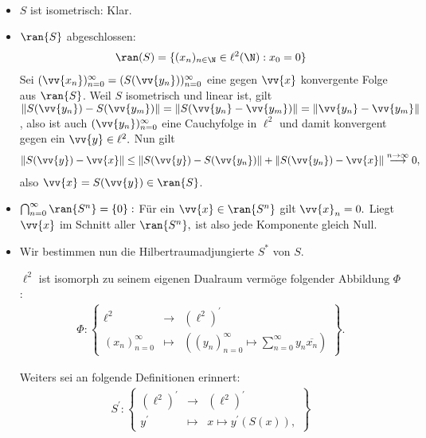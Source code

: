 \begin{solution}
  \leavevmode \\
  \begin{itemize}
      \item $S$ ist isometrisch: Klar.
      \item $\ran{S}$ abgeschlossen:
      \begin{align*}
        \ran(S) = \{(x_n)_{n \in \N} \in \ell^2(\N): x_0 = 0\}
      \end{align*}
      Sei $(\vv{x_n})_{n=0}^\infty =
      (S(\vv{y_n}))_{n=0}^\infty$ eine gegen $\vv{x}$ konvergente Folge aus $\ran{S}$. Weil $S$ isometrisch und linear ist, gilt
      $\| S(\vv{y_n}) - S(\vv{y_m})\|
      = \| S(\vv{y_n} - \vv{y_m}) \|
      = \| \vv{y_n} - \vv{y_m} \|$, also ist auch $(\vv{y_n})_{n=0}^\infty$ eine Cauchyfolge in $\ell^2$ und damit konvergent gegen ein $\vv{y} \in \ell^2.$ Nun gilt
      \begin{align*}
       \| S(\vv{y}) - \vv{x} \| \leq
       \| S(\vv{y}) - S(\vv{y_n}) \| + \| S(\vv{y_n}) - \vv{x} \|
       \stackrel{n \rightarrow \infty}{\longrightarrow} 0,
      \end{align*}
      also $\vv{x} = S(\vv{y}) \in \ran{S}$.
      \item $\bigcap_{n=0}^\infty \ran{S^n} = \{0\}:$ Für ein $\vv{x} \in \ran{S^n}$ gilt $\vv{x}_n = 0.$ Liegt $\vv{x}$ im Schnitt aller $\ran{S^n},$ ist also jede Komponente gleich Null.
      \item Wir bestimmen nun die Hilbertraumadjungierte $S^*$ von $S.$

      $\ell^2$ ist isomorph zu seinem eigenen Dualraum vermöge folgender Abbildung $\Phi$:
      \begin{align*}
            \Phi: \begin{Bmatrix}
       \ell^2 & \rightarrow & (\ell^2)^\prime \\
      (x_n)_{n=0}^\infty & \mapsto & ((y_n)_{n=0}^\infty \mapsto \sum_{n=0}^\infty y_n \overline{x_n})
        \end{Bmatrix}.
        \end{align*}

      Weiters sei an folgende Definitionen erinnert:
      \begin{align*}
        S^{\prime}: \begin{Bmatrix}
       (\ell^2)^{\prime} &\rightarrow & (\ell^2)^{\prime} \\
       y^{\prime} &\mapsto &x \mapsto y^{\prime}(S(x)),
        \end{Bmatrix}
      \end{align*}


\end{itemize}
\end{solution}
